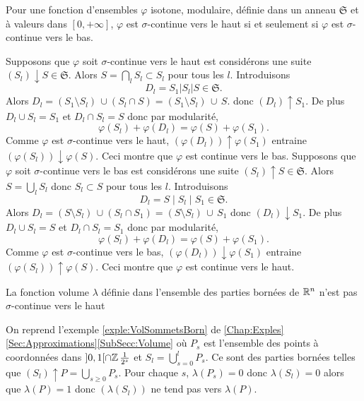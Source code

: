 \begin{propn}\label{prop:contBssicontH}
 Pour une fonction d'ensembles $\varphi$ isotone, modulaire, définie dans un anneau $\mathfrak{S}$ et à valeurs dans $[0,+\infty]$, $\varphi$ est $\sigma$-continue vers le haut si et seulement si $\varphi$ est $\sigma$-continue vers le bas.
\end{propn}
\begin{demo}
 Supposons que $\varphi$ soit $\sigma$-continue vers le haut est considérons une suite $(S_l)\downarrow S \in \mathfrak{S}$. Alors $S = \bigcap_l S_l \subset S_l$ pour tous les $l$. Introduisons
 \begin{displaymath}
  D_l = S_1|S_l|S \in \mathfrak{S}.
 \end{displaymath}
Alors $D_l = (S_1 \setminus S_l)\, \cup (S_l \cap S) = (S_1 \setminus S_l)\, \cup \,  S.$ donc $(D_l)\uparrow S_1$. De plus $D_l \cup S_l = S_1$ et $D_l \cap S_l = S$ donc par modularité,
\begin{displaymath}
 \varphi(S_l) + \varphi(D_l) = \varphi(S) + \varphi(S_1).
\end{displaymath}
Comme $\varphi$ est $\sigma$-continue vers le haut, $(\varphi(D_l))\uparrow \varphi(S_1)$ entraine $(\varphi(S_l))\downarrow \varphi(S)$. Ceci montre que $\varphi$ est continue vers le bas.\newline
Supposons que $\varphi$ soit $\sigma$-continue vers le bas est considérons une suite $(S_l)\uparrow S \in \mathfrak{S}$. Alors $S = \bigcup_l S_l$ donc $ S_l \subset S$ pour tous les $l$. Introduisons
 \begin{displaymath}
  D_l = S \mid S_l \mid S_1 \in \mathfrak{S}.
 \end{displaymath}
 Alors $D_l = (S \setminus S_l)\, \cup (S_l \cap S_1) = (S \setminus S_l)\, \cup \,  S_1$ donc $(D_l)\downarrow S_1$. De plus $D_l \cup S_l = S$ et $D_l \cap S_l = S_1$ donc par modularité,
\begin{displaymath}
 \varphi(S_l) + \varphi(D_l) = \varphi(S) + \varphi(S_1).
\end{displaymath}
Comme $\varphi$ est $\sigma$-continue vers le bas, $(\varphi(D_l))\downarrow \varphi(S_1)$ entraine $(\varphi(S_l))\uparrow \varphi(S)$. Ceci montre que $\varphi$ est continue vers le haut.
\end{demo}

\begin{propn}\label{prop:VolBornNonCont}
 La fonction volume $\lambda$ définie dans l'ensemble des parties bornées de $\mathbb{R}^n$ n'est pas $\sigma$-continue vers le haut
\end{propn}
\begin{demo}
 On reprend l'exemple \ref{exple:VolSommetsBorn} de \ref{Chap:Exples}\ref{Sec:Approximations}\ref{SubSecc:Volume} où $P_s$ est l'ensemble des points à coordonnées dans $]0,1[ \cap \mathbb{Z}\, \frac{1}{2^s}$ et $S_l = \bigcup_{s=0}^l P_s$. Ce sont des parties bornées telles que $(S_l)\uparrow P = \bigcup_{s\geq0} P_s$. Pour chaque $s$, $\lambda(P_s)=0$ donc $\lambda(S_l)=0$ alors que $\lambda(P) = 1$ donc $(\lambda(S_l))$ ne tend pas vers $\lambda(P)$.
\end{demo}

